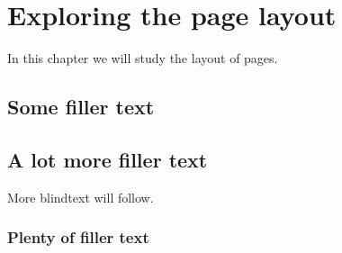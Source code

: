 \documentclass[a4paper,12pt]{book}
\begin{document}
\tableofcontents
\chapter[Page layout]{Exploring the page layout}
In this chapter we will study the layout of pages.
\section[Filler text]{Some filler text}
\blindtext
\section[More]{A lot more filler text}
More blindtext will follow.
\subsection[Plenty]{Plenty of filler text}
\blindtext[10]
\end{document}
